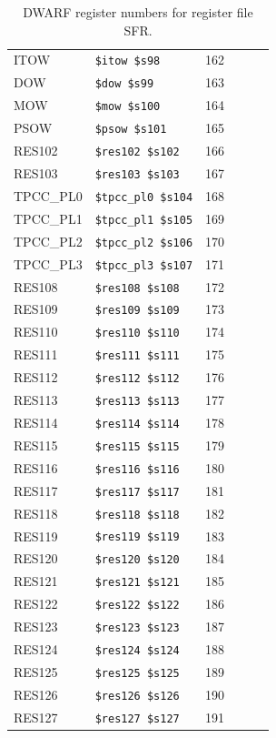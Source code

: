 \begin{table}
\begin{center}
{\begin{tabular}{|l|l|l||l|l|l|}
ITOW & \verb|$itow $s98| & 162 &
 & \verb|| &  \\
DOW & \verb|$dow $s99| & 163 &
 & \verb|| &  \\
MOW & \verb|$mow $s100| & 164 &
 & \verb|| &  \\
PSOW & \verb|$psow $s101| & 165 &
 & \verb|| &  \\
RES102 & \verb|$res102 $s102| & 166 &
 & \verb|| &  \\
RES103 & \verb|$res103 $s103| & 167 &
 & \verb|| &  \\
TPCC_PL0 & \verb|$tpcc_pl0 $s104| & 168 &
 & \verb|| &  \\
TPCC_PL1 & \verb|$tpcc_pl1 $s105| & 169 &
 & \verb|| &  \\
TPCC_PL2 & \verb|$tpcc_pl2 $s106| & 170 &
 & \verb|| &  \\
TPCC_PL3 & \verb|$tpcc_pl3 $s107| & 171 &
 & \verb|| &  \\
RES108 & \verb|$res108 $s108| & 172 &
 & \verb|| &  \\
RES109 & \verb|$res109 $s109| & 173 &
 & \verb|| &  \\
RES110 & \verb|$res110 $s110| & 174 &
 & \verb|| &  \\
RES111 & \verb|$res111 $s111| & 175 &
 & \verb|| &  \\
RES112 & \verb|$res112 $s112| & 176 &
 & \verb|| &  \\
RES113 & \verb|$res113 $s113| & 177 &
 & \verb|| &  \\
RES114 & \verb|$res114 $s114| & 178 &
 & \verb|| &  \\
RES115 & \verb|$res115 $s115| & 179 &
 & \verb|| &  \\
RES116 & \verb|$res116 $s116| & 180 &
 & \verb|| &  \\
RES117 & \verb|$res117 $s117| & 181 &
 & \verb|| &  \\
RES118 & \verb|$res118 $s118| & 182 &
 & \verb|| &  \\
RES119 & \verb|$res119 $s119| & 183 &
 & \verb|| &  \\
RES120 & \verb|$res120 $s120| & 184 &
 & \verb|| &  \\
RES121 & \verb|$res121 $s121| & 185 &
 & \verb|| &  \\
RES122 & \verb|$res122 $s122| & 186 &
 & \verb|| &  \\
RES123 & \verb|$res123 $s123| & 187 &
 & \verb|| &  \\
RES124 & \verb|$res124 $s124| & 188 &
 & \verb|| &  \\
RES125 & \verb|$res125 $s125| & 189 &
 & \verb|| &  \\
RES126 & \verb|$res126 $s126| & 190 &
 & \verb|| &  \\
RES127 & \verb|$res127 $s127| & 191 &
 & \verb|| &  \\
\hline \end{tabular}
}
\end{center}
\caption{DWARF register numbers for register file SFR.}
\label{table:DwarfId-SFR}
\end{table}

